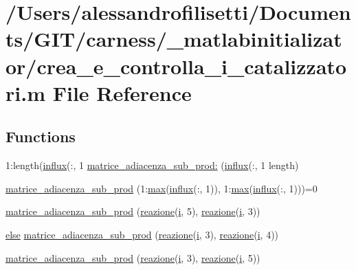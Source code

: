 \hypertarget{a00104}{\section{/\-Users/alessandrofilisetti/\-Documents/\-G\-I\-T/carness/\-\_\-matlabinitializator/crea\-\_\-e\-\_\-controlla\-\_\-i\-\_\-catalizzatori.m File Reference}
\label{a00104}
}
\subsection*{Functions}
\begin{DoxyCompactItemize}
\item 
1\-:length(\hyperlink{a00107_a902e747aeec6b345d3a057099152f41f}{influx}(\-:, 1 \hyperlink{a00104_a195fa22a2398c6f353792d39be88e00d}{matrice\-\_\-adiacenza\-\_\-sub\-\_\-prod\-:} (\hyperlink{a00107_a902e747aeec6b345d3a057099152f41f}{influx}(\-:, 1 length)
\item 
\hyperlink{a00104_ae7da9fe2a41436b8435a4d7e5066d310}{matrice\-\_\-adiacenza\-\_\-sub\-\_\-prod} (1\-:\hyperlink{a00104_a6d9c24e62aee61f54530163edf684ae2}{max}(\hyperlink{a00107_a902e747aeec6b345d3a057099152f41f}{influx}(\-:, 1)), 1\-:\hyperlink{a00104_a6d9c24e62aee61f54530163edf684ae2}{max}(\hyperlink{a00107_a902e747aeec6b345d3a057099152f41f}{influx}(\-:, 1)))=0
\item 
\hyperlink{a00104_aae3caf6a86a43bdf9fe5a6588adce1b2}{matrice\-\_\-adiacenza\-\_\-sub\-\_\-prod} (\hyperlink{a00110_a65cf6e12ba9a8c10222f3f1f71f7c95f}{reazione}(\hyperlink{a00113_ad3efca1ea6e3333daf30719ee0501862}{i}, 5), \hyperlink{a00110_a65cf6e12ba9a8c10222f3f1f71f7c95f}{reazione}(\hyperlink{a00113_ad3efca1ea6e3333daf30719ee0501862}{i}, 3))
\item 
\hyperlink{a00031_af5946383720aa572eb93e1e63afc23c2}{else} \hyperlink{a00104_a5ea236a7441a51f71adef1c414145d3b}{matrice\-\_\-adiacenza\-\_\-sub\-\_\-prod} (\hyperlink{a00110_a65cf6e12ba9a8c10222f3f1f71f7c95f}{reazione}(\hyperlink{a00113_ad3efca1ea6e3333daf30719ee0501862}{i}, 3), \hyperlink{a00110_a65cf6e12ba9a8c10222f3f1f71f7c95f}{reazione}(\hyperlink{a00113_ad3efca1ea6e3333daf30719ee0501862}{i}, 4))
\item 
\hyperlink{a00104_a3568a7566d3871de5460f8fe96044c26}{matrice\-\_\-adiacenza\-\_\-sub\-\_\-prod} (\hyperlink{a00110_a65cf6e12ba9a8c10222f3f1f71f7c95f}{reazione}(\hyperlink{a00113_ad3efca1ea6e3333daf30719ee0501862}{i}, 3), \hyperlink{a00110_a65cf6e12ba9a8c10222f3f1f71f7c95f}{reazione}(\hyperlink{a00113_ad3efca1ea6e3333daf30719ee0501862}{i}, 5))

\end{DoxyCompactItemize}
